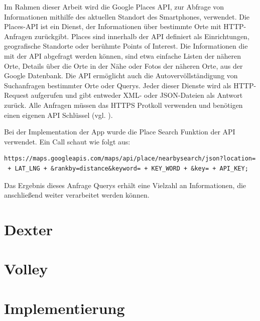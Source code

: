 Im Rahmen dieser Arbeit wird die Google Places API, zur Abfrage von Informationen mithilfe des aktuellen Standort des Smartphones, verwendet. Die Places-API ist ein Dienst, der Informationen über bestimmte Orte mit HTTP-Anfragen zurückgibt. Places sind innerhalb der API definiert als Einrichtungen, geografische Standorte oder berühmte Points of Interest. Die Informationen die mit der API abgefragt werden können, sind etwa einfache Listen der näheren Orte, Details über die Orte in der Nähe oder Fotos der näheren Orte, aus der Google Datenbank. Die API ermöglicht auch die  Autovervöllständigung von Suchanfragen bestimmter Orte oder Querys. Jeder dieser Dienste wird als HTTP-Request aufgerufen und gibt entweder XML- oder JSON-Dateien als Antwort zurück. Alle Anfragen müssen das HTTPS Protkoll verwenden und benötigen einen eigenen API Schlüssel (vgl. \cite{places_api}).

Bei der Implementation der App wurde die \glqq Place Search\grqq{} Funktion der API verwendet. Ein Call schaut wie folgt aus:

\begin{lstlisting}[basicstyle=\small]
https://maps.googleapis.com/maps/api/place/nearbysearch/json?location=
 + LAT_LNG + &rankby=distance&keyword= + KEY_WORD + &key= + API_KEY;
\end{lstlisting}

Das Ergebnis dieses Anfrage Querys erhält eine Vielzahl an Informationen, die anschließend weiter verarbeitet werden können.





\section{Dexter}

\section{Volley}

\section{Implementierung}



